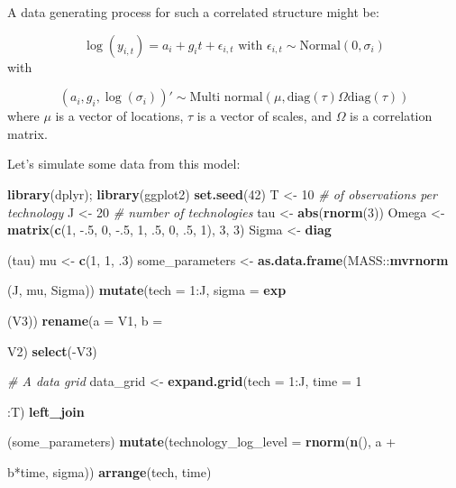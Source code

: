 \documentclass[]{book}
\newenvironment{Shaded}{\begin{snugshade}}{\end{snugshade}}
\newcommand{\KeywordTok}[1]{\textcolor[rgb]{0.13,0.29,0.53}{\textbf{{#1}}}}
\newcommand{\DataTypeTok}[1]{\textcolor[rgb]{0.13,0.29,0.53}{{#1}}}
\newcommand{\DecValTok}[1]{\textcolor[rgb]{0.00,0.00,0.81}{{#1}}}
\newcommand{\StringTok}[1]{\textcolor[rgb]{0.31,0.60,0.02}{{#1}}}
\newcommand{\CommentTok}[1]{\textcolor[rgb]{0.56,0.35,0.01}{\textit{{#1}}}}
\newcommand{\NormalTok}[1]{{#1}}
\begin{document}
A data generating process for such a correlated structure might be:

\[
\log(y_{i, t}) = a_{i} + g_{i}t + \epsilon_{i,t} \mbox{ with } \epsilon_{i,t} \sim \mbox{Normal}(0, \sigma_{i})
\] with

\[
(a_{i}, g_{i}, \log(\sigma_{i}))' \sim \mbox{Multi normal} \left(\mu, \mbox{diag}(\tau)\Omega\mbox{diag}(\tau)\right)
\] where \(\mu\) is a vector of locations, \(\tau\) is a vector of
scales, and \(\Omega\) is a correlation matrix.

Let's simulate some data from this model:

\begin{Shaded}
\begin{Highlighting}[]
\KeywordTok{library}\NormalTok{(dplyr); }\KeywordTok{library}\NormalTok{(ggplot2)}
\KeywordTok{set.seed}\NormalTok{(}\DecValTok{42}\NormalTok{)}
\NormalTok{T <-}\StringTok{ }\DecValTok{10} \CommentTok{# of observations per technology}
\NormalTok{J <-}\StringTok{ }\DecValTok{20} \CommentTok{# number of technologies}
\NormalTok{tau <-}\StringTok{ }\KeywordTok{abs}\NormalTok{(}\KeywordTok{rnorm}\NormalTok{(}\DecValTok{3}\NormalTok{))}
\NormalTok{Omega <-}\StringTok{ }\KeywordTok{matrix}\NormalTok{(}\KeywordTok{c}\NormalTok{(}\DecValTok{1}\NormalTok{, -.}\DecValTok{5}\NormalTok{, }\DecValTok{0}\NormalTok{, -.}\DecValTok{5}\NormalTok{, }\DecValTok{1}\NormalTok{, .}\DecValTok{5}\NormalTok{, }\DecValTok{0}\NormalTok{, .}\DecValTok{5}\NormalTok{, }\DecValTok{1}\NormalTok{), }\DecValTok{3}\NormalTok{, }\DecValTok{3}\NormalTok{)}
\NormalTok{Sigma <-}\StringTok{ }\KeywordTok{diag}\NormalTok{(tau)%*%}\StringTok{ }\NormalTok{Omega %*%}\StringTok{ }\KeywordTok{diag}\NormalTok{(tau)}
\NormalTok{mu <-}\StringTok{ }\KeywordTok{c}\NormalTok{(}\DecValTok{1}\NormalTok{, }\DecValTok{1}\NormalTok{, .}\DecValTok{3}\NormalTok{)}
\NormalTok{some_parameters <-}\StringTok{ }\KeywordTok{as.data.frame}\NormalTok{(MASS::}\KeywordTok{mvrnorm}\NormalTok{(J, mu, Sigma)) %>%}
\StringTok{  }\KeywordTok{mutate}\NormalTok{(}\DataTypeTok{tech =} \DecValTok{1}\NormalTok{:J,}
         \DataTypeTok{sigma =} \KeywordTok{exp}\NormalTok{(V3)) %>%}\StringTok{ }
\StringTok{  }\KeywordTok{rename}\NormalTok{(}\DataTypeTok{a =} \NormalTok{V1, }\DataTypeTok{b =} \NormalTok{V2) %>%}\StringTok{ }
\StringTok{  }\KeywordTok{select}\NormalTok{(-V3)}

\CommentTok{# A data grid}
\NormalTok{data_grid <-}\StringTok{ }\KeywordTok{expand.grid}\NormalTok{(}\DataTypeTok{tech =} \DecValTok{1}\NormalTok{:J, }\DataTypeTok{time =} \DecValTok{1}\NormalTok{:T) %>%}\StringTok{ }
\StringTok{  }\KeywordTok{left_join}\NormalTok{(some_parameters) %>%}\StringTok{ }
\StringTok{  }\KeywordTok{mutate}\NormalTok{(}\DataTypeTok{technology_log_level =} \KeywordTok{rnorm}\NormalTok{(}\KeywordTok{n}\NormalTok{(), a +}\StringTok{ }\NormalTok{b*time, sigma)) %>%}\StringTok{ }
\StringTok{  }\KeywordTok{arrange}\NormalTok{(tech, time)}


}}}}}}}
\end{Highlighting}
\end{Shaded}
\end{document}
